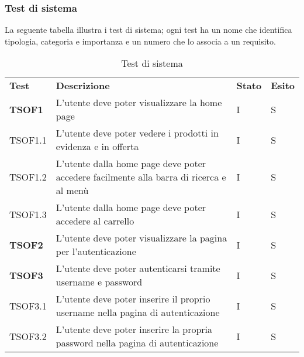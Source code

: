 \subsubsection{Test di sistema}
La seguente tabella illustra i test di sistema; ogni test ha un nome che identifica tipologia, categoria e importanza e un numero che lo associa a un requisito.
\begin{center}
    \centering
    \renewcommand{\arraystretch}{1.8}
    \label{tab:TestSistema}
    \begin{longtable}[!h]{p{60px} p{240px} p{35px} p{35px}}
        \caption{Test di sistema}                                                                                                                               \\
        \rowcolor{logo!70}
        \textbf{Test}   & \textbf{Descrizione}                                                                                & \textbf{Stato} & \textbf{Esito} \\
        \textbf{TSOF1}  & L'utente deve poter visualizzare la home page                                                       & I              & S              \\
        TSOF1.1         & L'utente deve poter vedere i prodotti in evidenza e in offerta                                      & I              & S              \\
        TSOF1.2         & L'utente dalla home page deve poter accedere facilmente alla barra di ricerca e al menù             & I              & S              \\
        TSOF1.3         & L'utente dalla home page deve poter accedere al carrello                                            & I              & S              \\
        \textbf{TSOF2}  & L'utente deve poter visualizzare la pagina per l'autenticazione                                     & I              & S              \\
        \textbf{TSOF3}  & L'utente deve poter autenticarsi tramite username e password                                        & I              & S              \\
        TSOF3.1         & L'utente deve poter inserire il proprio username nella pagina di autenticazione                     & I              & S              \\
        TSOF3.2         & L'utente deve poter inserire la propria password nella pagina di autenticazione                     & I              & S              \\

\end{longtable}
\end{center}
